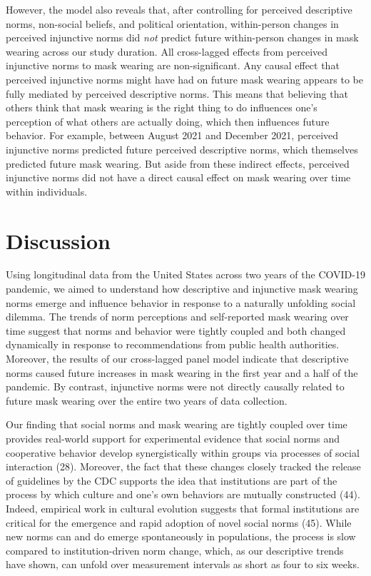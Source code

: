 \documentclass[
  man, donotrepeattitle,floatsintext]{apa6}
\begin{document}
However, the model also reveals that, after controlling for perceived descriptive norms, non-social beliefs, and political orientation, within-person changes in perceived injunctive norms did \emph{not} predict future within-person changes in mask wearing across our study duration. All cross-lagged effects from perceived injunctive norms to mask wearing are non-significant. Any causal effect that perceived injunctive norms might have had on future mask wearing appears to be fully mediated by perceived descriptive norms. This means that believing that others think that mask wearing is the right thing to do influences one's perception of what others are actually doing, which then influences future behavior. For example, between August 2021 and December 2021, perceived injunctive norms predicted future perceived descriptive norms, which themselves predicted future mask wearing. But aside from these indirect effects, perceived injunctive norms did not have a direct causal effect on mask wearing over time within individuals.

\hypertarget{discussion}{%
\section{Discussion}\label{discussion}}

Using longitudinal data from the United States across two years of the COVID-19 pandemic, we aimed to understand how descriptive and injunctive mask wearing norms emerge and influence behavior in response to a naturally unfolding social dilemma. The trends of norm perceptions and self-reported mask wearing over time suggest that norms and behavior were tightly coupled and both changed dynamically in response to recommendations from public health authorities. Moreover, the results of our cross-lagged panel model indicate that descriptive norms caused future increases in mask wearing in the first year and a half of the pandemic. By contrast, injunctive norms were not directly causally related to future mask wearing over the entire two years of data collection.

Our finding that social norms and mask wearing are tightly coupled over time provides real-world support for experimental evidence that social norms and cooperative behavior develop synergistically within groups via processes of social interaction (28). Moreover, the fact that these changes closely tracked the release of guidelines by the CDC supports the idea that institutions are part of the process by which culture and one's own behaviors are mutually constructed (44). Indeed, empirical work in cultural evolution suggests that formal institutions are critical for the emergence and rapid adoption of novel social norms (45). While new norms can and do emerge spontaneously in populations, the process is slow compared to institution-driven norm change, which, as our descriptive trends have shown, can unfold over measurement intervals as short as four to six weeks.
\end{document}
